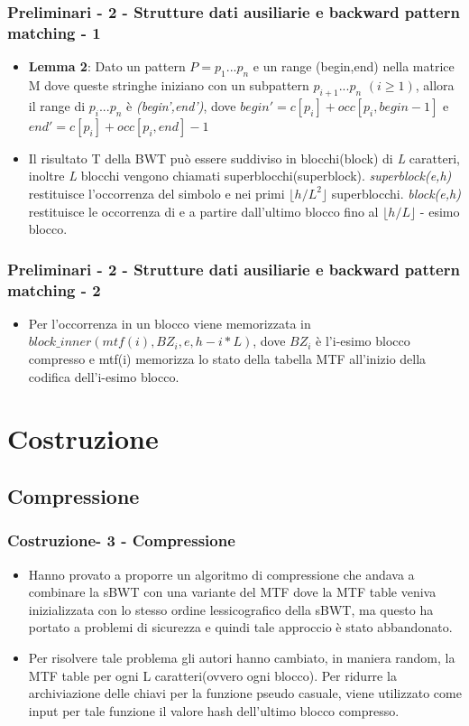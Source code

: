 \documentclass{beamer}
\begin{document}
\begin{frame}
\frametitle{Preliminari - 2 - Strutture dati ausiliarie e backward pattern matching - 1}
	\begin{itemize}
		\item \textbf{Lemma 2}:  Dato un pattern  $ P = p_{1}...p_{n} $  e un range (begin,end) nella matrice M dove queste stringhe iniziano con un subpattern $ p_{i+1}...p_{n} $ $ (i \geq  1) $, allora il range di $ p_{i}...p_{n} $ è \textit{(begin',end')}, dove $ begin' = c[p_{i}]+occ[p_{i},begin-1] $ e $ end' = c[p_{i}]+occ[p_{i},end] -1 $\pause
		\item Il risultato T della BWT può essere suddiviso in blocchi(block) di \textit{L} caratteri, inoltre \textit{L} blocchi vengono chiamati superblocchi(superblock). \textit{superblock(e,h)} restituisce l'occorrenza del simbolo e nei primi $ \lfloor h/L^{2} \rfloor $ superblocchi. \textit{block(e,h)} restituisce le occorrenza di e a partire dall’ultimo blocco fino al  $ \lfloor h/L \rfloor $ - esimo blocco. 
	\end{itemize}
\end{frame}

\begin{frame}
\frametitle{Preliminari - 2 - Strutture dati ausiliarie e backward pattern matching - 2}
	\begin{itemize}
		\item Per l'occorrenza in un blocco viene memorizzata in $ block\_inner(mtf(i),BZ_{i},e,h-i*L) $, dove $ BZ_{i} $ è l’i-esimo blocco compresso e mtf(i) memorizza lo stato della tabella MTF all’inizio della codifica dell'i-esimo blocco.	
	\end{itemize}
\end{frame}

\section{Costruzione}
\subsection{Compressione}
\begin{frame}
\frametitle{Costruzione- 3 - Compressione}
	\begin{itemize}
		\item Hanno provato a proporre un algoritmo di compressione che andava a combinare la sBWT con una variante del MTF dove la MTF table veniva inizializzata con lo stesso ordine lessicografico della sBWT, ma questo ha portato a problemi di sicurezza e quindi tale approccio è stato abbandonato.\pause
		\item Per risolvere tale problema gli autori hanno cambiato, in maniera random, la MTF table per ogni L caratteri(ovvero ogni blocco). Per ridurre la archiviazione delle chiavi per la funzione pseudo casuale, viene utilizzato come input per tale funzione il valore hash dell'ultimo blocco compresso.
	\end{itemize}
\end{frame}
\end{document}
